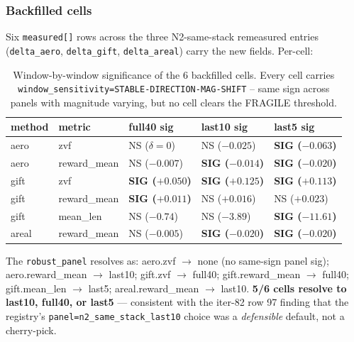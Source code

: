 \subsubsection{Backfilled cells}
Six \verb|measured[]| rows across the three N2-same-stack remeasured
entries (\texttt{delta\_aero}, \texttt{delta\_gift}, \texttt{delta\_areal})
carry the new fields. Per-cell:

\begin{table}[h]
\centering
\small
\begin{tabular}{ll lll}
\toprule
method & metric & full40 sig & last10 sig & last5 sig \\
\midrule
aero  & zvf          & NS ($\delta{=}0$)       & NS ($-0.025$) & \textbf{SIG ($-0.063$)} \\
aero  & reward\_mean & NS ($-0.007$)          & \textbf{SIG ($-0.014$)} & \textbf{SIG ($-0.020$)} \\
gift  & zvf          & \textbf{SIG ($+0.050$)} & \textbf{SIG ($+0.125$)} & \textbf{SIG ($+0.113$)} \\
gift  & reward\_mean & \textbf{SIG ($+0.011$)} & NS ($+0.016$) & NS ($+0.023$) \\
gift  & mean\_len    & NS ($-0.74$)            & NS ($-3.89$)  & \textbf{SIG ($-11.61$)} \\
areal & reward\_mean & NS ($-0.005$)          & \textbf{SIG ($-0.020$)} & \textbf{SIG ($-0.020$)} \\
\bottomrule
\end{tabular}
\caption{Window-by-window significance of the 6 backfilled cells. Every cell carries
\texttt{window\_sensitivity=STABLE-DIRECTION-MAG-SHIFT} -- same sign across panels
with magnitude varying, but no cell clears the FRAGILE threshold.}
\label{tab:p6-window-sensitivity}
\end{table}

The \verb|robust_panel| resolves as: aero.zvf $\to$ none (no same-sign panel sig);
aero.reward\_mean $\to$ last10; gift.zvf $\to$ full40;
gift.reward\_mean $\to$ full40; gift.mean\_len $\to$ last5;
areal.reward\_mean $\to$ last10. \textbf{5/6 cells resolve to last10,
full40, or last5} --- consistent with the iter-82 row 97 finding that the
registry's \texttt{panel=n2\_same\_stack\_last10} choice was a
\emph{defensible} default, not a cherry-pick.

